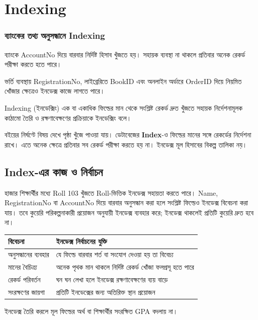 \section{Indexing}

\subsubsection{ব্যাংকের তথ্য অনুসন্ধানে Indexing}
ব্যাংকে AccountNo দিয়ে বারবার নির্দিষ্ট হিসাব খুঁজতে হয়। সহায়ক ব্যবস্থা না থাকলে প্রতিবার অনেক রেকর্ড পরীক্ষা করতে হতে পারে। 

ভর্তি ব্যবস্থায় RegistrationNo, লাইব্রেরিতে BookID এবং অনলাইন অর্ডারে OrderID দিয়ে নিয়মিত খোঁজার ক্ষেত্রেও ইনডেক্স কাজে লাগতে পারে।

\begin{definitionbox}{Indexing (ইনডেক্সিং)}
এক বা একাধিক ফিল্ডের মান থেকে সংশ্লিষ্ট রেকর্ড দ্রুত খুঁজতে সহায়ক নির্দেশনামূলক কাঠামো তৈরি ও রক্ষণাবেক্ষণের প্রক্রিয়াকে ইনডেক্সিং বলে।
\end{definitionbox}
বইয়ের নির্ঘণ্টে বিষয় দেখে পৃষ্ঠা খুঁজে পাওয়া যায়। ডেটাবেজের \textbf{Index}-ও ফিল্ডের মানের সঙ্গে রেকর্ডের নির্দেশনা রাখে। এতে অনেক ক্ষেত্রে প্রতিবার সব রেকর্ড পরীক্ষা করতে হয় না। ইনডেক্স মূল হিসাবের বিকল্প তালিকা নয়। 

\subsection{Index-এর কাজ ও নির্বাচন}
হাজার শিক্ষার্থীর মধ্যে Roll 103 খুঁজতে Roll-ভিত্তিক ইনডেক্স সহায়তা করতে পারে। Name, RegistrationNo বা AccountNo দিয়ে বারবার অনুসন্ধান করা হলে সংশ্লিষ্ট ফিল্ডেও ইনডেক্স বিবেচনা করা যায়। তবে কুয়েরি পরিকল্পনাকারী প্রয়োজন অনুযায়ী ইনডেক্স ব্যবহার করে; ইনডেক্স থাকলেই প্রতিটি কুয়েরি দ্রুত হবে না।
\begin{flushleft}\small
\begin{tabularx}{\linewidth}{|p{30mm}|X|}\hline
বিবেচনা & ইনডেক্স নির্বাচনের যুক্তি\\\hline
অনুসন্ধানের ব্যবহার & যে ফিল্ডে বারবার শর্ত বা সংযোগ দেওয়া হয় তা বিবেচ্য\\\hline
মানের বৈচিত্র্য & অনেক পৃথক মান থাকলে নির্দিষ্ট রেকর্ড খোঁজা ফলপ্রসূ হতে পারে\\\hline
রেকর্ড পরিবর্তন & ঘন ঘন লেখা হলে ইনডেক্স রক্ষণাবেক্ষণের ব্যয় বাড়ে\\\hline
সংরক্ষণের জায়গা & প্রতিটি ইনডেক্সের জন্য অতিরিক্ত স্থান প্রয়োজন\\\hline
\end{tabularx}
\end{flushleft}
ইনডেক্স তৈরি করলে মূল ফিল্ডের অর্থ বা শিক্ষার্থীর সংরক্ষিত GPA বদলায় না। 


